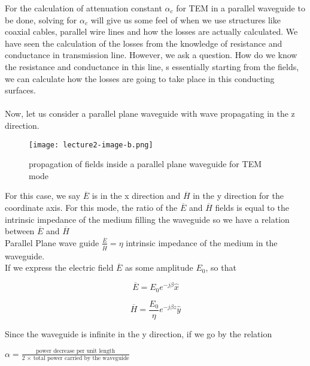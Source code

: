 For the calculation of  attenuation constant $\alpha_c$   for TEM in a parallel waveguide to be done, solving for $\alpha_c$  will give us some feel of when we use structures like coaxial cables, parallel wire lines and how the losses are actually calculated. We have seen the calculation of the losses from the knowledge of resistance and conductance in transmission line. However, we ask a question. How do we know the resistance and conductance in this line, s essentially starting from the fields, we can calculate how the losses are going to take place in this conducting surfaces.\\\\
Now, let us consider a parallel plane waveguide with wave propagating in the z direction.

\begin{figure}[H]
	\centering
	\texttt{[image: lecture2-image-b.png]}
	\caption{propagation of fields inside a parallel plane waveguide for TEM mode}
\end{figure}

For this case, we say $\overline{E}$ is in the x direction and $\overline{H}$  in the y direction for the coordinate axis. For this mode, the ratio of the $\overline{E}$ and  $\overline{H}$ fields is equal to the intrinsic impedance of the medium filling the waveguide so we have a relation between $\overline{E}$ and  $\overline{H}$\\
Parallel Plane wave guide $\frac{\overline{E}}{\overline{H}} = \eta $ intrinsic impedance of the medium in the waveguide.\\
If we express the electric field $\overline{E}$ as some amplitude $E_0$, so that

\begin{equation}
\overline{E} = E_0 e^{-j\beta }\hat{x}
\end{equation}

\begin{equation}
\overline{H} = \frac{E_0}{\eta} e^{-j\beta z}\hat{y}
\end{equation}



Since the waveguide is infinite in the y direction, if we go by the relation
\begin{center}
	$\alpha = \frac{\text{power decrease per unit length}}{\text{2 $\times$ total power carried by the waveguide}}$	
\end{center}

